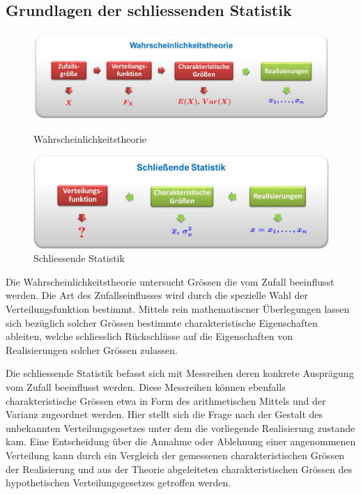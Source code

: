\subsection{Grundlagen der schliessenden Statistik}
\begin{figure}[H]
	\centering
	\includegraphics[scale=0.2]{images/exev_wahrscheinlichkeitstheorie.png}
	\caption{Wahrscheinlichkeitstheorie}
	\includegraphics[scale=0.2]{images/exev_schliessende-statistik.png}
	\caption{Schliessende Statistik}
\end{figure}
\begin{tcolorbox}[colback=green!5,colframe=green!40!black,title=Wahrscheinlichkeitstheorie]
Die Wahrscheinlichkeitstheorie untersucht Grössen die vom Zufall beeinflusst werden. Die Art des Zufallseinflusses wird durch die spezielle Wahl der Verteilungsfunktion bestimmt. Mittels rein mathematiscner Überlegungen lassen sich bezüglich solcher Grössen bestimmte charakteristische Eigenschaften ableiten, welche schliesslich Rückschlüsse auf die Eigenschaften von Realisierungen solcher Grössen zulassen.
\end{tcolorbox}
Die schliessende Statistik befasst sich mit Messreihen deren konkrete Ausprägung vom Zufall beeinflusst werden. Diese Messreihen können ebenfalls charakteristische Grössen etwa in Form des arithmetischen Mittels und der Varianz zugeordnet werden. Hier stellt sich die Frage nach der Gestalt des unbekannten Verteilungsgesetzes unter dem die vorliegende Realisierung zustande kam. Eine Entscheidung über die Annahme oder Ablehnung einer angenommenen Verteilung kann durch ein Vergleich der gemessenen charakteristischen Grössen der Realisierung und aus der Theorie abgeleiteten charakteristischen Grössen des hypothetischen Verteilungsgesetzes getroffen werden.
\pagebreak[2]
